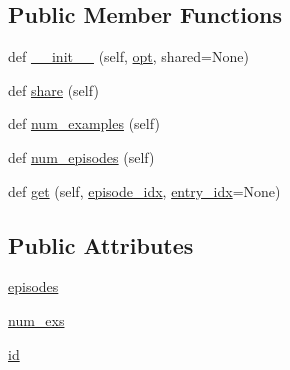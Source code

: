 \subsection*{Public Member Functions}
\begin{DoxyCompactItemize}
\item 
def \hyperlink{classparlai_1_1core_1_1teachers_1_1ParlAIDialogTeacher_ad79a47d28e60c24df72b8523aff6b247}{\+\_\+\+\_\+init\+\_\+\+\_\+} (self, \hyperlink{classparlai_1_1core_1_1agents_1_1Teacher_a3ce6243860ce978a897922863ed32fa4}{opt}, shared=None)
\item 
def \hyperlink{classparlai_1_1core_1_1teachers_1_1ParlAIDialogTeacher_a9e2eabf923a38b53865705786e07f461}{share} (self)
\item 
def \hyperlink{classparlai_1_1core_1_1teachers_1_1ParlAIDialogTeacher_a37c1c62c52860da9c63d9f6ed23ae6ae}{num\+\_\+examples} (self)
\item 
def \hyperlink{classparlai_1_1core_1_1teachers_1_1ParlAIDialogTeacher_aee1494d5dd0610530b4b93e56010e6f8}{num\+\_\+episodes} (self)
\item 
def \hyperlink{classparlai_1_1core_1_1teachers_1_1ParlAIDialogTeacher_a0ef5a3bbad31d95bc398a393ab0a310d}{get} (self, \hyperlink{classparlai_1_1core_1_1teachers_1_1FixedDialogTeacher_afd4ebab8063eb42d182d30a1a41f133e}{episode\+\_\+idx}, \hyperlink{classparlai_1_1core_1_1teachers_1_1FixedDialogTeacher_ae3201b15f3c3b46a2f3511bad9b43e7d}{entry\+\_\+idx}=None)
\end{DoxyCompactItemize}
\subsection*{Public Attributes}
\begin{DoxyCompactItemize}
\item 
\hyperlink{classparlai_1_1core_1_1teachers_1_1ParlAIDialogTeacher_a99d92211286cdcc382f723ebc9d272c4}{episodes}
\item 
\hyperlink{classparlai_1_1core_1_1teachers_1_1ParlAIDialogTeacher_accef414b3b1e708e7dd71a3e1871261f}{num\+\_\+exs}
\item 
\hyperlink{classparlai_1_1core_1_1teachers_1_1ParlAIDialogTeacher_a07870e07e8e6f708974ac9f51600e4fa}{id}
\end{DoxyCompactItemize}


